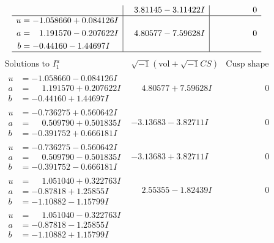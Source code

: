 \documentclass[1p]{elsarticle_modified}
\theoremstyle{definition}
\newcommand{\I}{\sqrt{-1}}
\begin{document}
$$\begin{array}{c|c|c}
 & \phantom{-}3.81145 - 3.11422 I & \phantom{-0.000000 } 0 \\ \hline\begin{aligned}
u &= -1.058660 + 0.084126 I \\
a &= \phantom{-}1.191570 - 0.207622 I \\
b &= -0.44160 - 1.44697 I\end{aligned}
 & \phantom{-}4.80577 - 7.59628 I & \phantom{-0.000000 } 0\\
 \hline 
 \end{array}$$\newpage$$\begin{array}{c|c|c}  
\text{Solutions to }I^u_{1}& \I (\text{vol} + \sqrt{-1}CS) & \text{Cusp shape}\\
 \hline 
\begin{aligned}
u &= -1.058660 - 0.084126 I \\
a &= \phantom{-}1.191570 + 0.207622 I \\
b &= -0.44160 + 1.44697 I\end{aligned}
 & \phantom{-}4.80577 + 7.59628 I & \phantom{-0.000000 } 0 \\ \hline\begin{aligned}
u &= -0.736275 + 0.560642 I \\
a &= \phantom{-}0.509790 + 0.501835 I \\
b &= -0.391752 + 0.666181 I\end{aligned}
 & -3.13683 - 3.82711 I & \phantom{-0.000000 } 0 \\ \hline\begin{aligned}
u &= -0.736275 - 0.560642 I \\
a &= \phantom{-}0.509790 - 0.501835 I \\
b &= -0.391752 - 0.666181 I\end{aligned}
 & -3.13683 + 3.82711 I & \phantom{-0.000000 } 0 \\ \hline\begin{aligned}
u &= \phantom{-}1.051040 + 0.322763 I \\
a &= -0.87818 + 1.25855 I \\
b &= -1.10882 - 1.15799 I\end{aligned}
 & \phantom{-}2.55355 - 1.82439 I & \phantom{-0.000000 } 0 \\ \hline\begin{aligned}
u &= \phantom{-}1.051040 - 0.322763 I \\
a &= -0.87818 - 1.25855 I \\
b &= -1.10882 + 1.15799 I\end{aligned}

\end{array}$$
\end{document}
